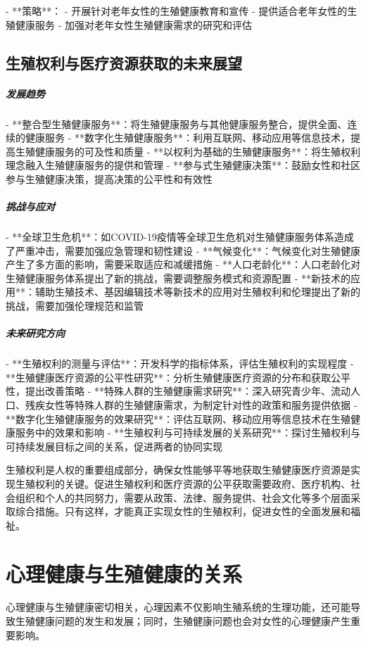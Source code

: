 \begin{enumerate}
- **策略**：
  - 开展针对老年女性的生殖健康教育和宣传
  - 提供适合老年女性的生殖健康服务
  - 加强对老年女性生殖健康需求的研究和评估

\subsection{生殖权利与医疗资源获取的未来展望}

\subparagraph{发展趋势}

- **整合型生殖健康服务**：将生殖健康服务与其他健康服务整合，提供全面、连续的健康服务
- **数字化生殖健康服务**：利用互联网、移动应用等信息技术，提高生殖健康服务的可及性和质量
- **以权利为基础的生殖健康服务**：将生殖权利理念融入生殖健康服务的提供和管理
- **参与式生殖健康决策**：鼓励女性和社区参与生殖健康决策，提高决策的公平性和有效性

\subparagraph{挑战与应对}

- **全球卫生危机**：如COVID-19疫情等全球卫生危机对生殖健康服务体系造成了严重冲击，需要加强应急管理和韧性建设
- **气候变化**：气候变化对生殖健康产生了多方面的影响，需要采取适应和减缓措施
- **人口老龄化**：人口老龄化对生殖健康服务体系提出了新的挑战，需要调整服务模式和资源配置
- **新技术的应用**：辅助生殖技术、基因编辑技术等新技术的应用对生殖权利和伦理提出了新的挑战，需要加强伦理规范和监管

\subparagraph{未来研究方向}

- **生殖权利的测量与评估**：开发科学的指标体系，评估生殖权利的实现程度
- **生殖健康医疗资源的公平性研究**：分析生殖健康医疗资源的分布和获取公平性，提出改善策略
- **特殊人群的生殖健康需求研究**：深入研究青少年、流动人口、残疾女性等特殊人群的生殖健康需求，为制定针对性的政策和服务提供依据
- **数字化生殖健康服务的效果研究**：评估互联网、移动应用等信息技术在生殖健康服务中的效果和影响
- **生殖权利与可持续发展的关系研究**：探讨生殖权利与可持续发展目标之间的关系，促进两者的协同实现

生殖权利是人权的重要组成部分，确保女性能够平等地获取生殖健康医疗资源是实现生殖权利的关键。促进生殖权利和医疗资源的公平获取需要政府、医疗机构、社会组织和个人的共同努力，需要从政策、法律、服务提供、社会文化等多个层面采取综合措施。只有这样，才能真正实现女性的生殖权利，促进女性的全面发展和福祉。

\section{心理健康与生殖健康的关系}

心理健康与生殖健康密切相关，心理因素不仅影响生殖系统的生理功能，还可能导致生殖健康问题的发生和发展；同时，生殖健康问题也会对女性的心理健康产生重要影响。


\end{enumerate}
